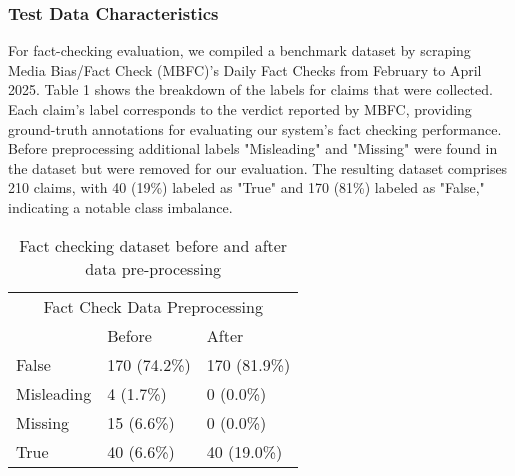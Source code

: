 \documentclass{scrartcl}
\begin{document}
\subsubsection{Test Data Characteristics}
For fact-checking evaluation, we compiled a benchmark dataset by scraping Media Bias/Fact Check (MBFC)’s Daily Fact Checks from February to April 2025. Table 1 shows the breakdown of the labels for claims that were collected. Each claim’s label corresponds to the verdict reported by MBFC, providing ground-truth annotations for evaluating our system’s fact checking performance. Before preprocessing additional labels "Misleading" and "Missing" were found in the dataset but were removed for our evaluation. The resulting dataset comprises 210 claims, with 40 (19\%) labeled as "True" and 170 (81\%) labeled as "False," indicating a notable class imbalance. 
\begin{table}[H]
\begin{center}
\begin{tabular}{llll}
\hline
\multicolumn{4}{c}{Fact Check Data Preprocessing}                     \\
                & \multicolumn{2}{l}{Before}       & After            \\ \hline
False           & \multicolumn{2}{l}{170 (74.2\%)} & 170 (81.9\%)     \\
Misleading& \multicolumn{2}{l}{4 (1.7\%)}    & 0 (0.0\%)        \\
Missing         & \multicolumn{2}{l}{15 (6.6\%)}   & 0 (0.0\%)        \\
True& \multicolumn{2}{l}{40 (6.6\%)}   & 40 (19.0\%)      \\ \hline
\end{tabular}
\caption{Fact checking dataset before and after data pre-processing}
\end{center}
\label{tab:my_table}
\end{table}
\end{document}
